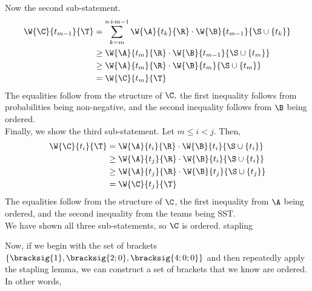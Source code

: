 {{    Now the second sub-statement.
    \begin{align*}
        \W{\C}{t_{m-1}}{\T} &= \sum_{k=m}^{n+m-1} \W{\A}{t_k}{\R} \cdot \W{\B}{t_{m-1}}{\S \cup \{t_k\}}\\
        &\geq \W{\A}{t_m}{\R} \cdot \W{\B}{t_{m-1}}{\S \cup \{t_m\}}\\
        &\geq \W{\A}{t_m}{\R} \cdot \W{\B}{t_{m}}{\S \cup \{t_m\}}\\
        &= \W{\C}{t_{m}}{\T}
    \end{align*}
    The equalities follow from the structure of $\C,$ the first inequality follows from probabilities being non-negative, and the second inequality follows from $\B$ being ordered.\\

    Finally, we show the third sub-statement. Let $m \leq i < j.$ Then,
    \begin{align*}
        \W{\C}{t_i}{\T} &= \W{\A}{t_i}{\R} \cdot \W{\B}{t_i}{\S \cup \{t_i\}}\\
        &\geq \W{\A}{t_j}{\R} \cdot \W{\B}{t_i}{\S \cup \{t_i\}}\\
        &\geq \W{\A}{t_j}{\R} \cdot \W{\B}{t_j}{\S \cup \{t_j\}}\\
        &= \W{\C}{t_j}{\T}
    \end{align*}
    The equalities follow from the structure of $\C$, the first inequality from $\A$ being ordered, and the second inequality from the teams being SST.\\

    We have shown all three sub-statements, so $\C$ is ordered.
    }{stapling}{\fried}

    Now, if we begin with the set of brackets $\{\bracksig{1}, \bracksig{2; 0}, \bracksig{4; 0; 0}\}$ and then repeatedly apply the stapling lemma, we can construct a set of brackets that we know are ordered. In other words,


}
